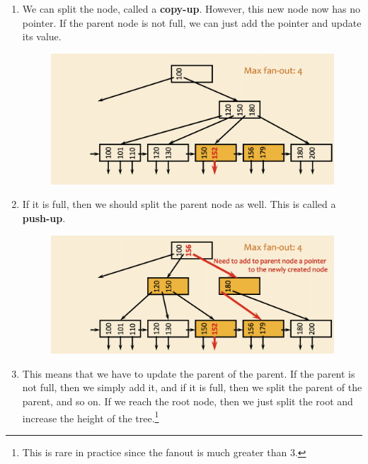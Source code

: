 \documentclass{article}
\begin{document}
\begin{definition}[Insertion]
\begin{enumerate}
        \item We can split the node, called a \textbf{copy-up}. However, this new node now has no pointer. If the parent node is not full, we can just add the pointer and update its value. 

        \begin{figure}[H]
          \centering 
          \includegraphics[scale=0.4]{img/insertion_2.png}
          \caption{} 
          \label{fig:insertion_2}
        \end{figure}

        \item If it is full, then we should split the parent node as well. This is called a \textbf{push-up}. 

        \begin{figure}[H]
          \centering 
          \includegraphics[scale=0.4]{img/insertion_3.png}
          \caption{} 
          \label{fig:insertion_3.png}
        \end{figure}

        \item This means that we have to update the parent of the parent. If the parent is not full, then we simply add it, and if it is full, then we split the parent of the parent, and so on. If we reach the root node, then we just split the root and increase the height of the tree.\footnote{This is rare in practice since the fanout is much greater than 3.}
      \end{enumerate}
    \end{definition}
\end{document}
